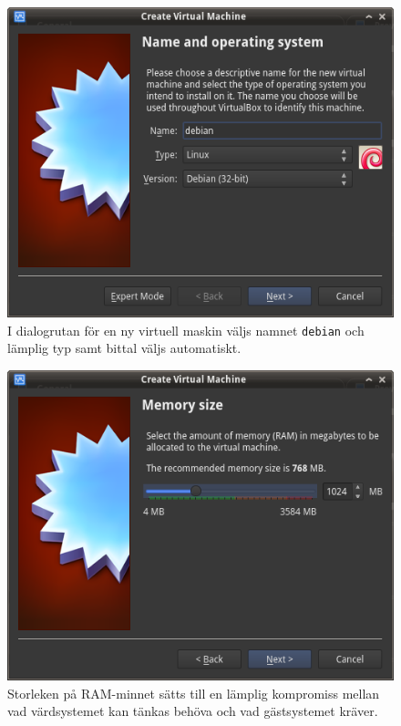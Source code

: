 \begin{figure}[htbp]
  \centering
    \includegraphics[width=\linewidth]{img/A_new-02}
    \caption{I dialogrutan för en ny virtuell maskin väljs namnet
             \texttt{debian} och lämplig typ samt bittal väljs automatiskt.}
  \label{fig:A_new-02}
\end{figure}

\begin{figure}[htbp]
  \centering
    \includegraphics[width=\linewidth]{img/A_new-03}
    \caption{Storleken på RAM-minnet sätts till en lämplig kompromiss mellan
             vad värdsystemet kan tänkas behöva och vad gästsystemet kräver.}
  \label{}
\end{figure}

